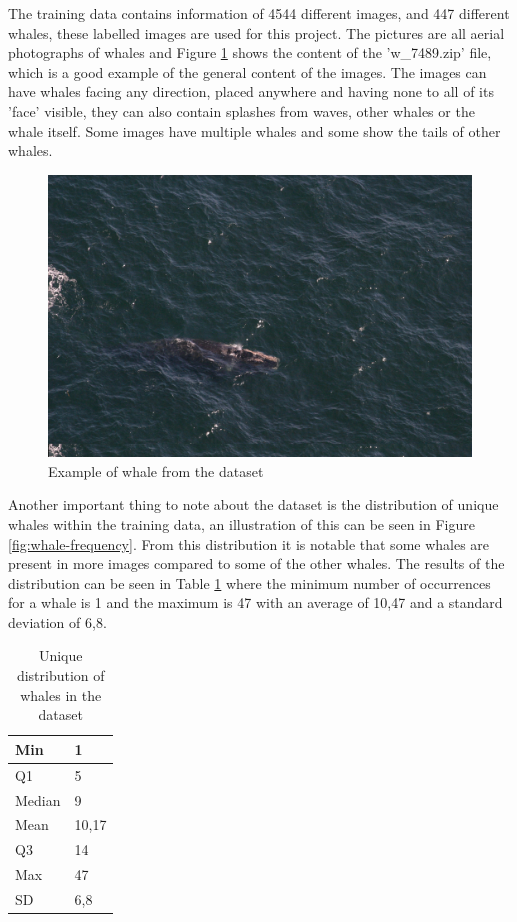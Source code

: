 The training data contains information of 4544 different images, and 447 different whales, these labelled images are used for this project. The pictures are all aerial photographs of whales and Figure \ref{fig:whale-example} shows the content of the 'w\_7489.zip' file, which is a good example of the general content of the images. The images can have whales facing any direction, placed anywhere and having none to all of its 'face' visible, they can also contain splashes from waves, other whales or the whale itself. Some images have multiple whales and some show the tails of other whales. 
\begin{figure}
	\centering
	\includegraphics[width=\linewidth]{Images/w_7489}
	\caption{Example of whale from the dataset}
	\label{fig:whale-example}
\end{figure}

Another important thing to note about the dataset is the distribution of unique whales within the training data, an illustration of this can be seen in Figure \ref{fig:whale-frequency}. From this distribution it is notable that some whales are present in more images compared to some of the other whales. The results of the distribution can be seen in Table \ref{table:whale-distribution} where the minimum number of occurrences for a whale is 1 and the maximum is 47 with an average of 10,47 and a standard deviation of 6,8.

\begin{table}
	\centering
	\caption{Unique distribution of whales in the dataset}
	\label{table:whale-distribution}
	\begin{tabularx}{\linewidth}{|X|X|}
		\hline
		Min    & 1     \\ \hline
		Q1     & 5     \\ \hline
		Median & 9     \\ \hline
		Mean   & 10,17 \\ \hline
		Q3     & 14    \\ \hline
		Max    & 47    \\ \hline
		SD     & 6,8   \\ \hline
	\end{tabularx}
\end{table}

